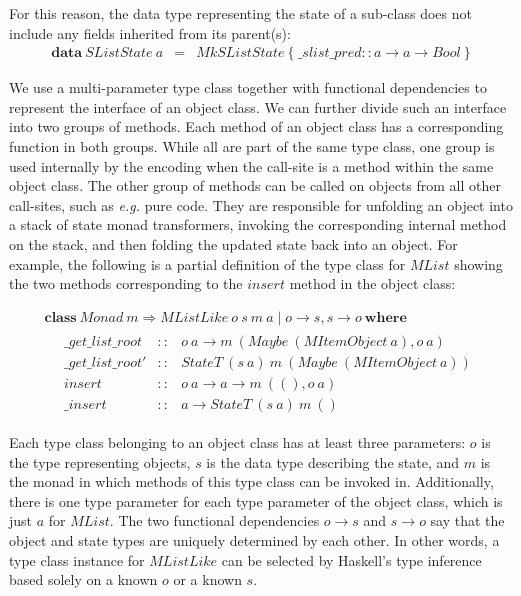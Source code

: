 \documentclass[runningheads,a4paper]{llncs}
\newcommand{\todo}[1]{[{\color{blue}#1}]}
\begin{document}
For this reason, the data type representing the state of a sub-class does not include any fields inherited from its parent(s):
\begin{displaymath}
\begin{array}{lcl}
\mathbf{data}~\mathit{SListState}~a & = & \mathit{MkSListState}~\{~ \_ slist \_ pred :: a \to a \to \mathit{Bool}~\}
\end{array}
\end{displaymath}

We use a multi-parameter type class together with functional dependencies \cite{jones2000type} to represent the interface of an object class. We can further divide such an interface into two groups of methods. Each method of an object class has a corresponding function in both groups. While all are part of the same type class, one group is used internally by the encoding when the call-site is a method within the same object class. The other group of methods can be called on objects from all other call-sites, such as \emph{e.g.} pure code. They are responsible for unfolding an object into a stack of state monad transformers, invoking the corresponding internal method on the stack, and then folding the updated state back into an object. For example, the following is a partial definition of the type class for $\mathit{MList}$ showing the two methods corresponding to the $\mathit{insert}$ method in the object class:
 
\begin{displaymath}
\begin{array}{l}
\mathbf{class}~\mathit{Monad}~m \Rightarrow \mathit{MListLike}~o~s~m~a \mid o \to s, s \to o~\mathbf{where} \\
\quad \begin{array}{lcl}
\_\mathit{get}\_\mathit{list}\_\mathit{root} & :: & o~a \to m~(\mathit{Maybe}~(\mathit{MItemObject~a}), o~a)\\
\_\mathit{get}\_\mathit{list}\_\mathit{root}' & :: & \mathit{StateT}~(s~a)~m~(\mathit{Maybe}~(\mathit{MItemObject}~a))\\
\mathit{insert} & :: & o~a \to a \to m~((),o~a) \\
\_\mathit{insert} & :: & a \to \mathit{StateT}~(s~a)~m~()
\end{array}
\end{array}
\end{displaymath}

Each type class belonging to an object class has at least three parameters: $o$ is the type representing objects, $s$ is the data type describing the state, and $m$ is the monad in which methods of this type class can be invoked in. Additionally, there is one type parameter for each type parameter of the object class, which is just $a$ for $\mathit{MList}$. The two functional dependencies $o \to s$ and $s \to o$ say that the object and state types are uniquely determined by each other. In other words, a type class instance for $\mathit{MListLike}$ can be selected by Haskell's type inference based solely on a known $o$ or a known $s$.
\end{document}
